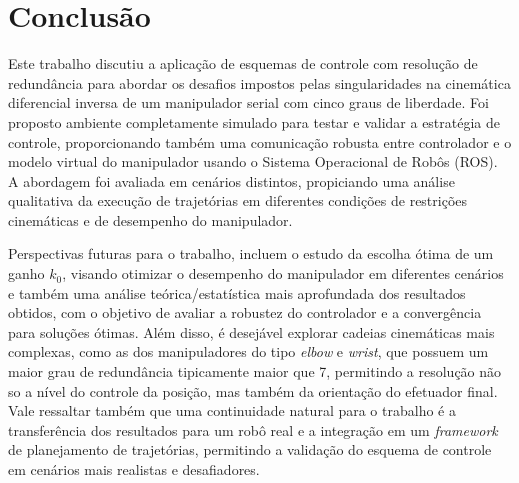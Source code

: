 \chapter{Conclusão}\label{cap:conclusao}

Este trabalho discutiu a aplicação de esquemas de controle com resolução de 
redundância para abordar os desafios impostos pelas singularidades na cinemática 
diferencial inversa de um manipulador serial com cinco graus de liberdade. Foi proposto ambiente completamente
simulado para testar e validar a estratégia de controle, proporcionando também uma comunicação robusta 
entre controlador e o modelo virtual do manipulador usando o Sistema Operacional de Robôs (ROS). 
A abordagem foi avaliada em cenários distintos, propiciando uma análise qualitativa da execução de
trajetórias em diferentes condições de restrições cinemáticas e de desempenho do manipulador.

Perspectivas futuras para o trabalho, incluem o estudo da escolha ótima de um ganho \(k_0\), visando otimizar 
o desempenho do manipulador em diferentes cenários e também uma análise teórica/estatística mais aprofundada dos resultados obtidos, com o objetivo de avaliar a robustez do
controlador e a convergência para soluções ótimas. Além disso, é desejável explorar cadeias cinemáticas 
mais complexas, como as dos manipuladores do tipo \emph{elbow} e \emph{wrist}, que possuem um maior 
grau de redundância tipicamente maior que 7, permitindo a resolução não so a nível do controle da posição, mas 
também da orientação do efetuador final. Vale ressaltar também que uma continuidade natural para o trabalho 
é a transferência dos resultados para um robô real e a integração em um \emph{framework} de planejamento de trajetórias, permitindo
a validação do esquema de controle em cenários mais realistas e desafiadores.